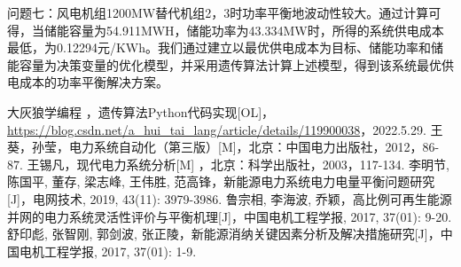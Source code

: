 \documentclass{cumcmthesis}
\begin{document}
	问题七：风电机组1200MW替代机组2，3时功率平衡地波动性较大。通过计算可得，当储能容量为54.911MWH，储能功率为43.334MW时，所得的系统供电成本最低，为0.12294元/KWh。我们通过建立以最优供电成本为目标、储能功率和储能容量为决策变量的优化模型，并采用遗传算法计算上述模型，得到该系统最优供电成本的功率平衡解决方案。
	
	
	 \newpage
\begin{thebibliography}{99}
	
	大灰狼学编程
	，遗传算法Python代码实现[OL]，\url{https://blog.csdn.net/a_hui_tai_lang/article/details/119900038}，2022.5.29.
	王葵，孙莹，电力系统自动化（第三版）[M]，北京：中国电力出版社，2012，86-87.
	王锡凡，现代电力系统分析[M] ，北京：科学出版社，2003，117-134.
	李明节, 陈国平, 董存, 梁志峰, 王伟胜, 范高锋，新能源电力系统电力电量平衡问题研究[J]，电网技术, 2019, 43(11): 3979-3986.
	鲁宗相, 李海波, 乔颖，高比例可再生能源并网的电力系统灵活性评价与平衡机理[J]，中国电机工程学报, 2017, 37(01): 9-20.
	舒印彪, 张智刚, 郭剑波, 张正陵，新能源消纳关键因素分析及解决措施研究[J]，中国电机工程学报, 2017, 37(01): 1-9.
	
	
\end{thebibliography}	
\end{document}
